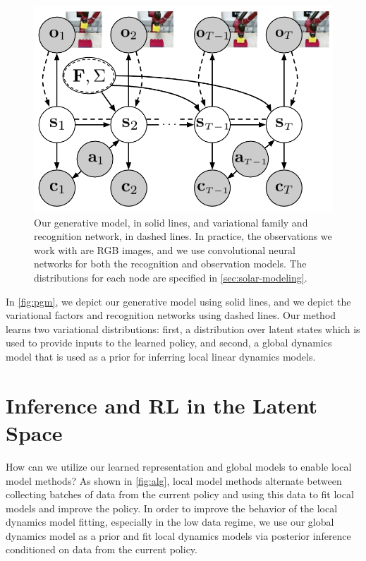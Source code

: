 \begin{figure}
    \centering
    \includegraphics[width=0.9\linewidth]{img/solar/pgm.png}
    \caption[The generative model used by \metabbr]{Our generative model, in solid lines, and variational family and recognition network, in dashed lines. In practice, the observations we work with are RGB images, and we use convolutional neural networks for both the recognition and observation models. The distributions for each node are specified in \autoref{sec:solar-modeling}.}
    \label{fig:pgm}
    \vspace{-.5em}
\end{figure}

In \autoref{fig:pgm}, we depict our generative model using solid lines, and we depict the variational factors and recognition networks using dashed lines. Our method learns two variational distributions: first, a distribution over latent states which is used to provide inputs to the learned policy, and second, a global dynamics model that is used as a prior for inferring local linear dynamics models.


\section{Inference and RL in the Latent Space}
\label{sec:inference}

How can we utilize our learned representation and global models to enable local model methods? As shown in \autoref{fig:alg}, local model methods alternate between collecting batches of data from the current policy and using this data to fit local models and improve the policy. In order to improve the behavior of the local dynamics model fitting, especially in the low data regime, we use our global dynamics model as a prior and fit local dynamics models via posterior inference conditioned on data from the current policy.

